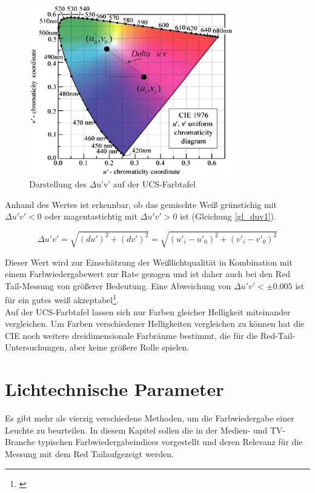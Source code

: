 \begin{figure}[H]     %
\centering
\includegraphics[width=0.8\textwidth]{bilder/duv1} 
\caption {Darstellung des $\Delta$u'v' auf der UCS-Farbtafel}\label{b_duv}
\end{figure}


Anhand des Wertes ist erkennbar, ob das gemischte Weiß grünstichig mit $\Delta u'v' < 0$ oder magentastichtig mit $\Delta u'v' > 0$ ist (Gleichung \ref{gl_duv1}).

\begin{equation}\label{gl_duv1}
		\Delta u'v'=\sqrt{(du')^{2}+(dv')^{2}}=\sqrt{(u'_{i}-u'_{0})^{2}+(v'_{i}-v'_{0})^{2}}
\end{equation}

Dieser Wert wird zur Einschätzung der Weißlichtqualität in Kombination mit einem Farbwiedergabewert zur Rate gezogen und ist daher auch bei den \glqq Red Tail\grqq -Messung von größerer Bedeutung. Eine Abweichung von $\Delta u'v' < \pm 0.005$ ist für ein gutes weiß akzeptabel\footnote{\cite{ohno}}.\\

Auf der UCS-Farbtafel lassen sich nur Farben gleicher Helligkeit miteinander vergleichen. Um Farben verschiedener Helligkeiten vergleichen zu können hat die CIE noch weitere dreidimensionale Farbräume bestimmt, die für die Red-Tail-Untersuchungen, aber keine größere Rolle spielen.\newpage


\chapter{Lichtechnische Parameter}
Es gibt mehr als vierzig verschiedene Methoden, um die Farbwiedergabe einer Leuchte zu beurteilen. In diesem Kapitel sollen die in der Medien- und TV-Branche typischen Farbwiedergabeindices vorgestellt und deren Relevanz für die Messung mit dem \glqq Red Tail\grqq  aufgezeigt werden.

